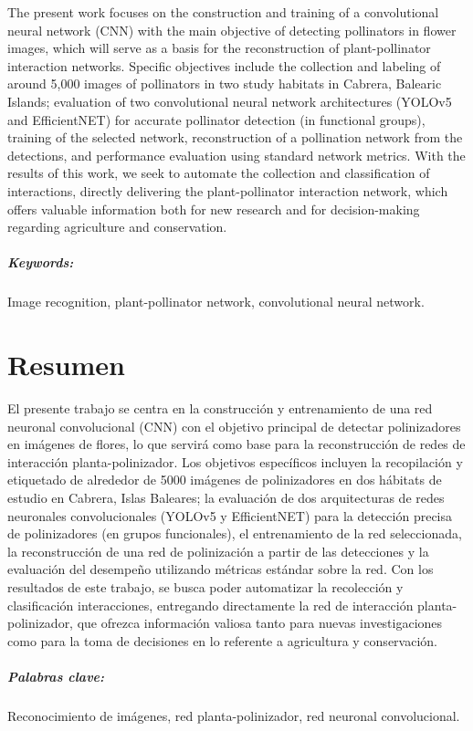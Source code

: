 \onehalfspacing

The present work focuses on the construction and training of a convolutional neural network (CNN) with the main objective of detecting pollinators in flower images, which will serve as a basis for the reconstruction of plant-pollinator interaction networks. Specific objectives include the collection and labeling of around 5,000 images of pollinators in two study habitats in Cabrera, Balearic Islands; evaluation of two convolutional neural network architectures (YOLOv5 and EfficientNET) for accurate pollinator detection (in functional groups), training of the selected network, reconstruction of a pollination network from the detections, and performance evaluation using standard network metrics. With the results of this work, we seek to automate the collection and classification of interactions, directly delivering the plant-pollinator interaction network, which offers valuable information both for new research and for decision-making regarding agriculture and conservation.

\vspace{1.5cm}

\paragraph{Keywords:} Image recognition, plant-pollinator network, convolutional neural network.

\chapter*{Resumen}

\onehalfspacing

El presente trabajo se centra en la construcción y entrenamiento de una red neuronal convolucional (CNN) con el objetivo principal de detectar polinizadores en imágenes de flores, lo que servirá como base para la reconstrucción de redes de interacción planta-polinizador. Los objetivos específicos incluyen la recopilación y etiquetado de alrededor de 5000 imágenes de polinizadores en dos hábitats de estudio en Cabrera, Islas Baleares; la evaluación de dos arquitecturas de redes neuronales convolucionales (YOLOv5 y EfficientNET) para la detección precisa de polinizadores (en grupos funcionales), el entrenamiento de la red seleccionada, la reconstrucción de una red de polinización a partir de las detecciones y la evaluación del desempeño utilizando métricas estándar sobre la red. Con los resultados de este trabajo, se busca poder automatizar la recolección y clasificación interacciones, entregando directamente la red de interacción planta-polinizador, que ofrezca información valiosa tanto para nuevas investigaciones como para la toma de decisiones en lo referente a agricultura y conservación.



\vspace{1.5cm}

\paragraph{Palabras clave:} Reconocimiento de imágenes, red planta-polinizador, red neuronal convolucional. 